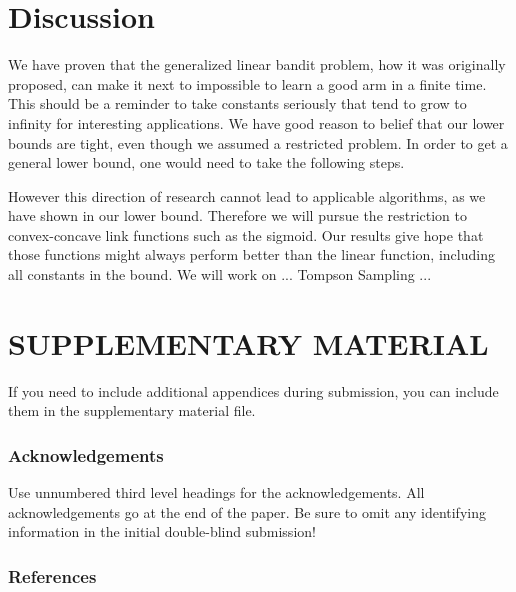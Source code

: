 \documentclass[twoside]{article} \usepackage{aistats2017}
\begin{document}
\section{Discussion}
We have proven that the generalized linear bandit problem, how it was originally proposed, can make it next to impossible to learn a good arm in a finite time. This should be a reminder to take constants seriously that tend to grow to infinity for interesting applications. We have good reason to belief that our lower bounds are tight, even though we assumed a restricted problem. In order to get a general lower bound, one would need to take the following steps.
However this direction of research cannot lead to applicable algorithms, as we have shown in our lower bound. Therefore we will pursue the restriction to convex-concave link functions such as the sigmoid. Our results give hope that those functions might always perform better than the linear function, including all constants in the bound. We will work on ... Tompson Sampling ... 
\section{SUPPLEMENTARY MATERIAL}

If you need to include additional appendices during submission, you
can include them in the supplementary material file.


\newpage



\subsubsection*{Acknowledgements}

Use unnumbered third level headings for the acknowledgements.  All
acknowledgements go at the end of the paper.  Be sure to omit any
identifying information in the initial double-blind submission!


\subsubsection*{References}
\end{document}
